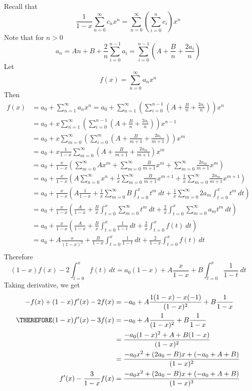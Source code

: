 Recall that 
\[
\frac{1}{1-x} \sum_{n=0}^\infty c_n x^n
= \sum_{n=0}^\infty \left( \sum_{i=0}^n c_i \right) x^n
\]
Note that for $n > 0$
\[
a_n
= An + B + \frac{2}{n} \sum_{i=0}^{n-1} a_i
= \sum_{i=0}^{n-1} \left( A + \frac{B}{n} + \frac{2a_i}{n} \right)
\]
Let
\[
f(x) = \sum_{n=0}^\infty a_n x^n
\]
Then
\begin{align*}
f(x)
&= a_0 + \sum_{n=1}^\infty a_n x^n
= a_0 +
   \sum_{n=1}^\infty
   \left(
     \sum_{i=0}^{n-1} \left( A + \frac{B}{n} + \frac{2a_i}{n} \right)
   \right) x^n
   \\
&= a_0 +
   x
   \sum_{n=1}^\infty
   \left(
     \sum_{i=0}^{n-1} \left( A + \frac{B}{n} + \frac{2a_i}{n} \right)
   \right) x^{n - 1}
   \\
&= a_0 +
   x
   \sum_{m=0}^\infty
   \left(
     \sum_{i=0}^{m} \left( A + \frac{B}{m+1} + \frac{2a_i}{m+1} \right)
   \right) x^{m}
   \\
&= a_0 +
   x
   \frac{1}{1 - x}
   \sum_{m=0}^\infty
     \left( A + \frac{B}{m+1} + \frac{2a_m}{m+1} \right)
     x^{m}
   \\
&= a_0 +
   \frac{x}{1 - x}
   \left(
   \sum_{m=0}^\infty A x^m
   + \sum_{m=0}^\infty \frac{B}{m + 1} x^m
   + \sum_{m=0}^\infty \frac{2a_m}{m+1} x^m
     \right)
   \\
&= a_0
   + \frac{x}{1 - x}
   \left(
   A \sum_{n=0}^\infty x^n
   + \frac{1}{x} \sum_{m=0}^\infty \frac{B}{m + 1} x^{m+1}
   + \frac{1}{x} \sum_{m=0}^\infty \frac{2a_m}{m+1} x^{m+1}
   \right)
   \\
&= a_0
   + \frac{x}{1 - x}
   \left(
   A \frac{1}{1-x}
   + \frac{1}{x} \sum_{m=0}^\infty B \int_{t=0}^x t^m \ dt
   + \frac{1}{x} \sum_{m=0}^\infty 2a_m \int_{t=0}^x t^m \ dt
   \right)
   \\
&= a_0
   + \frac{x}{1 - x}
   \left(
   \frac{A}{1-x}
   + \frac{B}{x} \int_{t=0}^x \sum_{m=0}^\infty  t^m \ dt
   + \frac{2}{x} \int_{t=0}^x \sum_{m=0}^\infty a_m  t^m \ dt
   \right)
   \\
&= a_0
   + \frac{x}{1 - x}
   \left(
   \frac{A}{1-x}
   + \frac{B}{x} \int_{t=0}^x \frac{1}{1-t} \ dt
   + \frac{2}{x} \int_{t=0}^x f(t) \ dt
   \right)
   \\
&= a_0
   + A \frac{x}{(1-x)^2}
   + \frac{B}{1-x} \int_{t=0}^x \frac{1}{1-t} \ dt
   + \frac{2}{1-x} \int_{t=0}^x f(t) \ dt
   \\
\end{align*}
Therefore
\[
(1 - x)f(x) - 2 \int_{t=0}^x f(t) \ dt
= a_0(1-x)
  + A \frac{x}{1-x}
  + B \int_{t=0}^x \frac{1}{1-t} \ dt
\]
Taking derivative, we get
\begin{align*}
-f(x) + (1-x)f'(x) - 2f(x)
&= -a_0
  + A \frac{1(1-x) - x(-1)}{(1-x)^2}
  + B \frac{1}{1-x}
\\
\THEREFORE
(1 - x)f'(x) - 3f(x) 
&= -a_0
  + A \frac{1}{(1-x)^2}
  + B \frac{1}{1-x}
\\
&= \frac{-a_0(1-x)^2 + A + B(1-x)}{(1-x)^2}
\\
&= \frac{-a_0x^2 + (2 a_0 - B) x + (-a_0 + A + B)}{(1-x)^2}
\\
f'(x) - \frac{3}{1-x}f(x) 
&= \frac{-a_0x^2 + (2 a_0 - B) x + (-a_0 + A + B)}{(1-x)^3}
\end{align*}

